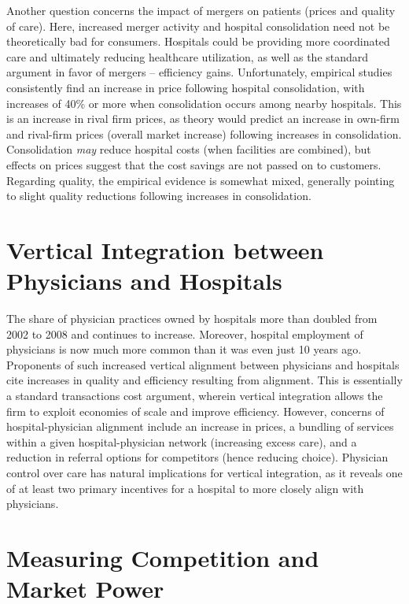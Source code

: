 \documentclass[
  letterpaper,
  DIV=11,
  numbers=noendperiod]{scrreport}
\theoremstyle{definition}
\theoremstyle{remark}
\begin{document}
Another question concerns the impact of mergers on patients (prices and
quality of care). Here, increased merger activity and hospital
consolidation need not be theoretically bad for consumers. Hospitals
could be providing more coordinated care and ultimately reducing
healthcare utilization, as well as the standard argument in favor of
mergers -- efficiency gains. Unfortunately, empirical studies
consistently find an increase in price following hospital consolidation,
with increases of 40\% or more when consolidation occurs among nearby
hospitals. This is an increase in rival firm prices, as theory would
predict an increase in own-firm and rival-firm prices (overall market
increase) following increases in consolidation. Consolidation
\textit{may} reduce hospital costs (when facilities are combined), but
effects on prices suggest that the cost savings are not passed on to
customers. Regarding quality, the empirical evidence is somewhat mixed,
generally pointing to slight quality reductions following increases in
consolidation.

\hypertarget{vertical-integration-between-physicians-and-hospitals}{%
\section{Vertical Integration between Physicians and
Hospitals}\label{vertical-integration-between-physicians-and-hospitals}}

The share of physician practices owned by hospitals more than doubled
from 2002 to 2008 and continues to increase. Moreover, hospital
employment of physicians is now much more common than it was even just
10 years ago. Proponents of such increased vertical alignment between
physicians and hospitals cite increases in quality and efficiency
resulting from alignment. This is essentially a standard transactions
cost argument, wherein vertical integration allows the firm to exploit
economies of scale and improve efficiency. However, concerns of
hospital-physician alignment include an increase in prices, a bundling
of services within a given hospital-physician network (increasing excess
care), and a reduction in referral options for competitors (hence
reducing choice). Physician control over care has natural implications
for vertical integration, as it reveals one of at least two primary
incentives for a hospital to more closely align with physicians.

\hypertarget{measuring-competition-and-market-power}{%
\section{Measuring Competition and Market
Power}\label{measuring-competition-and-market-power}}
\end{document}

